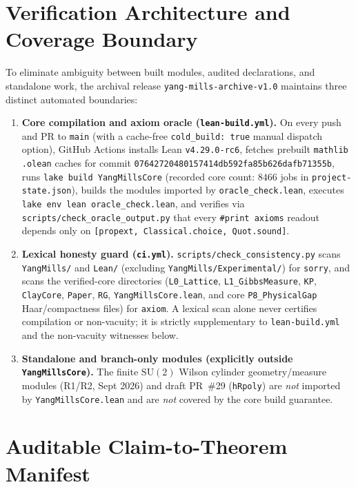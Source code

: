 \documentclass[11pt]{article}
\begin{document}
\section{Verification Architecture and Coverage Boundary}

To eliminate ambiguity between built modules, audited declarations, and standalone work,
the archival release \texttt{yang-mills-archive-v1.0} maintains three distinct automated
boundaries:

\begin{enumerate}
  \item \textbf{Core compilation and axiom oracle (\texttt{lean-build.yml}).}
  On every push and PR to \texttt{main} (with a cache-free \texttt{cold\_build: true}
  manual dispatch option), GitHub Actions installs Lean \texttt{v4.29.0-rc6}, fetches
  prebuilt \texttt{mathlib} \texttt{.olean} caches for commit
  \texttt{07642720480157414db592fa85b626dafb71355b}, runs \texttt{lake build YangMillsCore}
  (recorded core count: $8466$ jobs in \texttt{project-state.json}), builds the modules
  imported by \texttt{oracle\_check.lean}, executes \texttt{lake env lean oracle\_check.lean},
  and verifies via \texttt{scripts/check\_oracle\_output.py} that every \texttt{\#print axioms}
  readout depends only on \texttt{[propext, Classical.choice, Quot.sound]}.
  \item \textbf{Lexical honesty guard (\texttt{ci.yml}).}
  \texttt{scripts/check\_consistency.py} scans \texttt{YangMills/} and \texttt{Lean/}
  (excluding \texttt{YangMills/Experimental/}) for \texttt{sorry}, and scans the verified-core
  directories (\texttt{L0\_Lattice}, \texttt{L1\_GibbsMeasure}, \texttt{KP},
  \texttt{ClayCore}, \texttt{Paper}, \texttt{RG}, \texttt{YangMillsCore.lean}, and core
  \texttt{P8\_PhysicalGap} Haar/compactness files) for \texttt{axiom}. A lexical scan alone
  never certifies compilation or non-vacuity; it is strictly supplementary to
  \texttt{lean-build.yml} and the non-vacuity witnesses below.
  \item \textbf{Standalone and branch-only modules (explicitly outside \texttt{YangMillsCore}).}
  The finite $\mathrm{SU}(2)$ Wilson cylinder geometry/measure modules (R1/R2, Sept 2026)
  and draft PR~\#29 (\texttt{hRpoly}) are \emph{not} imported by \texttt{YangMillsCore.lean}
  and are \emph{not} covered by the core build guarantee.
\end{enumerate}

\section{Auditable Claim-to-Theorem Manifest}
\end{document}
